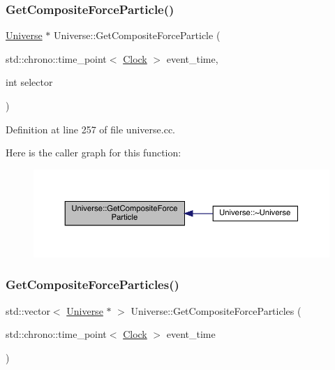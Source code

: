 \subsubsection{\texorpdfstring{Get\+Composite\+Force\+Particle()}{GetCompositeForceParticle()}}
{\footnotesize\ttfamily \hyperlink{class_universe}{Universe} $\ast$ Universe\+::\+Get\+Composite\+Force\+Particle (\begin{DoxyParamCaption}\item[{std\+::chrono\+::time\+\_\+point$<$ \hyperlink{universe_8h_a0ef8d951d1ca5ab3cfaf7ab4c7a6fd80}{Clock} $>$}]{event\+\_\+time,  }\item[{int}]{selector }\end{DoxyParamCaption})}



Definition at line 257 of file universe.\+cc.

Here is the caller graph for this function\+:
\nopagebreak
\begin{figure}[H]
\begin{center}
\leavevmode
\includegraphics[width=350pt]{class_universe_a3e2acc1d75765a6e8e852fca919c5b96_icgraph}
\end{center}
\end{figure}
\mbox{\label{class_universe_aed37d7224b4e31bdfb0632e39bf19694}} 
\subsubsection{\texorpdfstring{Get\+Composite\+Force\+Particles()}{GetCompositeForceParticles()}}
{\footnotesize\ttfamily std\+::vector$<$ \hyperlink{class_universe}{Universe} $\ast$ $>$ Universe\+::\+Get\+Composite\+Force\+Particles (\begin{DoxyParamCaption}\item[{std\+::chrono\+::time\+\_\+point$<$ \hyperlink{universe_8h_a0ef8d951d1ca5ab3cfaf7ab4c7a6fd80}{Clock} $>$}]{event\+\_\+time }\end{DoxyParamCaption})}



